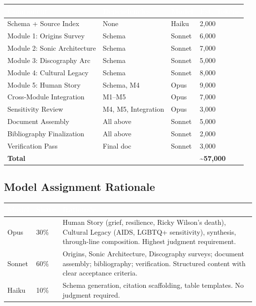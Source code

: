 \documentclass[11pt,letterpaper]{article}
\newcommand{\tableheader}[1]{\textbf{\sffamily\textcolor{white}{#1}}}
\begin{document}
\begin{center}
\begin{tabularx}{\textwidth}{L{3.5cm}L{3cm}L{2cm}C{2cm}}
\toprule
{}
\tableheader{Component} & \tableheader{Dependencies} & \tableheader{Model} & \tableheader{Est. Tokens} \\
\midrule
Schema + Source Index & None & Haiku & 2,000 \\
Module 1: Origins Survey & Schema & Sonnet & 6,000 \\
Module 2: Sonic Architecture & Schema & Sonnet & 7,000 \\
Module 3: Discography Arc & Schema & Sonnet & 5,000 \\
Module 4: Cultural Legacy & Schema & Sonnet & 8,000 \\
Module 5: Human Story & Schema, M4 & Opus & 9,000 \\
Cross-Module Integration & M1--M5 & Opus & 7,000 \\
Sensitivity Review & M4, M5, Integration & Opus & 3,000 \\
Document Assembly & All above & Sonnet & 5,000 \\
Bibliography Finalization & All above & Sonnet & 2,000 \\
Verification Pass & Final doc & Sonnet & 3,000 \\
\midrule
\textbf{Total} & & & \textbf{\~{}57,000} \\
\bottomrule
\end{tabularx}
\end{center}

\subsection{Model Assignment Rationale}

\begin{center}
\begin{tabularx}{\textwidth}{L{2cm}C{1.5cm}X}
\toprule
{}
\tableheader{Model} & \tableheader{Share} & \tableheader{Rationale} \\
\midrule
Opus & 30\% & Human Story (grief, resilience, Ricky Wilson's death), Cultural Legacy (AIDS, LGBTQ+ sensitivity), synthesis, through-line composition. Highest judgment requirement. \\
Sonnet & 60\% & Origins, Sonic Architecture, Discography surveys; document assembly; bibliography; verification. Structured content with clear acceptance criteria. \\
Haiku & 10\% & Schema generation, citation scaffolding, table templates. No judgment required. \\
\bottomrule
\end{tabularx}
\end{center}
\end{document}
